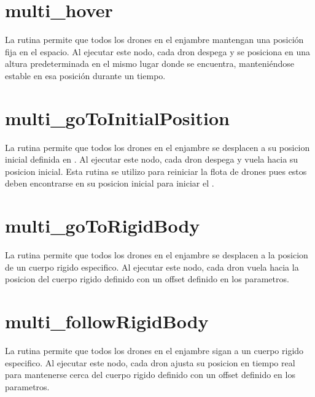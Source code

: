 \documentclass[a4paper,11pt,spanish]{sphinxmanual}
\begin{document}
\section{multi\_hover}
\label{\detokenize{rutinas_enjambre:multi-hover}}
\sphinxAtStartPar
La rutina  permite que todos los drones en el enjambre mantengan una posición fija en el espacio. Al ejecutar este nodo, cada dron despega y se posiciona en una altura predeterminada en el mismo lugar donde se encuentra, manteniéndose estable en esa posición durante un tiempo.


\section{multi\_goToInitialPosition}
\label{\detokenize{rutinas_enjambre:multi-gotoinitialposition}}
\sphinxAtStartPar
La rutina  permite que todos los drones en el enjambre se desplacen a su posicion inicial definida en . Al ejecutar este nodo, cada dron despega y vuela hacia su posicion inicial. Esta rutina se utilizo para reiniciar la flota de drones pues estos deben encontrarse en su posicion inicial para iniciar el .


\section{multi\_goToRigidBody}
\label{\detokenize{rutinas_enjambre:multi-gotorigidbody}}
\sphinxAtStartPar
La rutina  permite que todos los drones en el enjambre se desplacen a la posicion de un cuerpo rigido especifico. Al ejecutar este nodo, cada dron vuela hacia la posicion del cuerpo rigido definido con un offset definido en los parametros.


\section{multi\_followRigidBody}
\label{\detokenize{rutinas_enjambre:multi-followrigidbody}}
\sphinxAtStartPar
La rutina  permite que todos los drones en el enjambre sigan a un cuerpo rigido especifico. Al ejecutar este nodo, cada dron ajusta su posicion en tiempo real para mantenerse cerca del cuerpo rigido definido con un offset definido en los parametros.



\renewcommand{\indexname}{Índice}
\printindex
\end{document}
